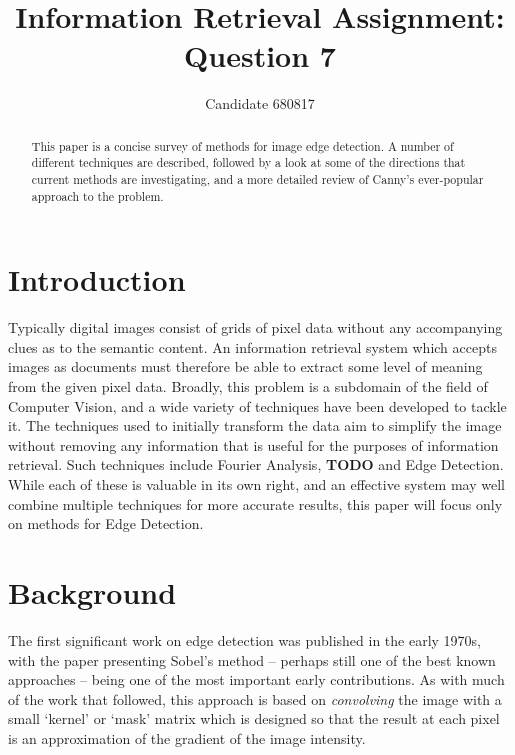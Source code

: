 \documentclass{acm_proc_article-sp}
\begin{document}
\title{Information Retrieval Assignment: Question 7}

\author{
Candidate 680817
}

\maketitle
\begin{abstract}
This paper is a concise survey of methods for image edge detection. A number of
different techniques are described, followed by a look at some of the
directions that current methods are investigating, and a more detailed review
of Canny's ever-popular approach to the problem.
\end{abstract}

\section*{Introduction}

Typically digital images consist of grids of pixel data without any
accompanying clues as to the semantic content. An information retrieval system
which accepts images as documents must therefore be able to extract some level
of meaning from the given pixel data. Broadly, this problem is a subdomain of
the field of Computer Vision, and a wide variety of techniques have been
developed to tackle it. The techniques used to initially transform the data aim
to simplify the image without removing any information that is useful for the
purposes of information retrieval. Such techniques include Fourier Analysis,
\textbf{TODO} and Edge Detection. While each of these is valuable in its own right, and
an effective system may well combine multiple techniques for more accurate
results, this paper will focus only on methods for Edge Detection.



\section*{Background}

The first significant work on edge detection was published in the early 1970s,
with the paper presenting Sobel's method \cite{Sobel:1970:CMM:905376} --
perhaps still one of the best known approaches -- being one of the most
important early contributions. As with much of the work that followed, this
approach is based on \textit{convolving} the image with a small `kernel' or
`mask' matrix which is designed so that the result at each pixel is an
approximation of the gradient of the image intensity. 
\end{document}

